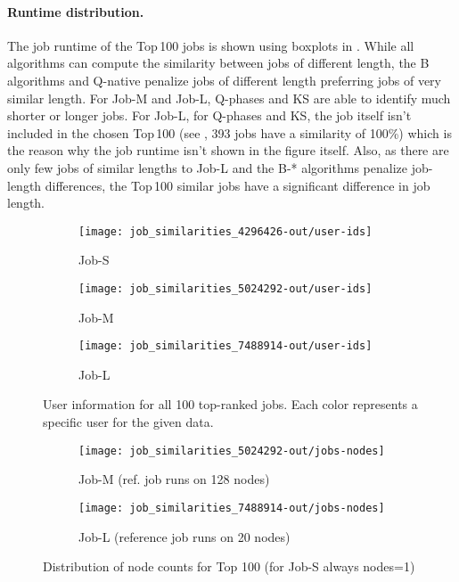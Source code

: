 \documentclass{jhps}
\begin{document}
\paragraph{Runtime distribution.}
The job runtime of the Top\,100 jobs is shown using boxplots in .
While all algorithms can compute the similarity between jobs of different length, the B algorithms and Q-native penalize jobs of different length preferring jobs of very similar length.
For Job-M and Job-L, Q-phases and KS are able to identify much shorter or longer jobs.
For Job-L, for Q-phases and KS, the job itself isn't included in the chosen Top\,100 (see , 393 jobs have a similarity of 100\%) which is the reason why the job runtime isn't shown in the figure itself.
Also, as there are only few jobs of similar lengths to Job-L and the B-* algorithms penalize job-length differences, the Top\,100 similar jobs have a significant difference in job length.

\begin{figure}[bt]
\begin{subfigure}{0.48\textwidth}
\centering
\texttt{[image: job\_similarities\_4296426-out/user-ids]}
\caption{Job-S}\label{fig:users-job-S}
\end{subfigure}
\begin{subfigure}{0.48\textwidth}
\centering
\texttt{[image: job\_similarities\_5024292-out/user-ids]}
\caption{Job-M}\label{fig:users-job-M}
\end{subfigure}
\begin{subfigure}{0.48\textwidth}
\centering
\texttt{[image: job\_similarities\_7488914-out/user-ids]}
\caption{Job-L}\label{fig:users-job-L}
\end{subfigure}

\caption{User information for all 100 top-ranked jobs. Each color represents a specific user for the given data.}
\label{fig:userids}
\end{figure}

\begin{figure}
\begin{subfigure}{0.48\textwidth}
\centering
\texttt{[image: job\_similarities\_5024292-out/jobs-nodes]}
\caption{Job-M (ref. job runs on 128 nodes)}\label{fig:nodes-job-M}
\end{subfigure}
\begin{subfigure}{0.48\textwidth}
\centering
\texttt{[image: job\_similarities\_7488914-out/jobs-nodes]}
\caption{Job-L (reference job runs on 20 nodes)}\label{fig:nodes-job-L}
\end{subfigure}
\centering
\caption{Distribution of node counts for Top 100 (for Job-S always nodes=1)}%
\label{fig:nodes-job}
\end{figure}
\end{document}
